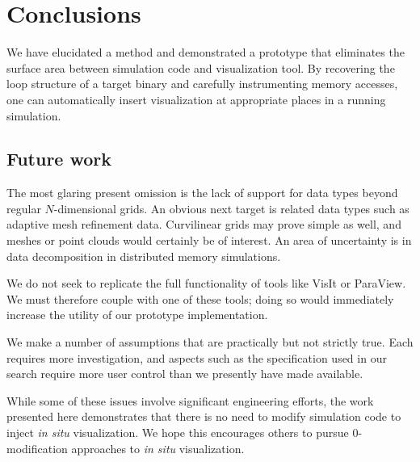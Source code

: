 \section{Conclusions}

We have elucidated a method and demonstrated a prototype that
eliminates the surface area between simulation code and visualization
tool.  By recovering the loop structure of a target binary and
carefully instrumenting memory accesses, one can automatically insert
visualization at appropriate places in a running simulation.


\subsection{Future work}

The most glaring present omission is the lack of support for data
types beyond regular $N$-dimensional grids.  An obvious next target
is related data types such as adaptive mesh refinement data.
Curvilinear grids may prove simple as well, and meshes or point clouds
would certainly be of interest.  An area of uncertainty is in data
decomposition in distributed memory simulations.

We do not seek to replicate the full functionality of tools like
VisIt or ParaView.  We must therefore couple with one of these tools;
doing so would immediately increase the utility of our prototype
implementation.

We make a number of assumptions that are practically but not strictly
true.  Each requires more investigation, and aspects such as the
specification used in our search require more user control than we
presently have made available.

While some of these issues involve significant engineering efforts,
the work presented here demonstrates that there is no need to modify
simulation code to
inject \textit{in situ} visualization.  We hope this encourages others
to pursue 0-modification approaches to \textit{in situ} visualization.

